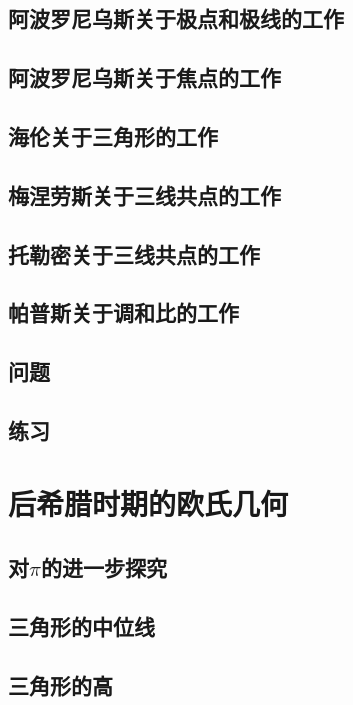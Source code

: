 \documentclass[cn,fancy,blue,11pt]{elegantbook}
\begin{document}
\section{阿波罗尼乌斯关于极点和极线的工作}

\section{阿波罗尼乌斯关于焦点的工作}

\section{海伦关于三角形的工作}

\section{梅涅劳斯关于三线共点的工作}

\section{托勒密关于三线共点的工作}

\section{帕普斯关于调和比的工作}

\section{问题}

\section{练习}

\chapter{后希腊时期的欧氏几何}

\section{对$\pi$的进一步探究}

\section{三角形的中位线}

\section{三角形的高}
\end{document}
